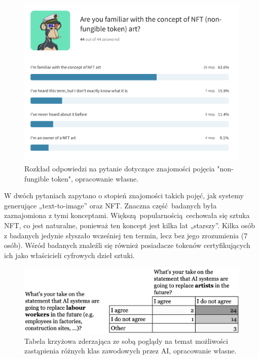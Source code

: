 \documentclass[12pt]{article}
\begin{document}
\begin{figure}[H]
    \centering
    \includegraphics[scale=0.21]{p8}
    \caption{Rozkład odpowiedzi na pytanie dotyczące znajomości pojęcia "non-fungible token", opracowanie własne.}
    \label{fig:25}
\end{figure}


W dwóch pytaniach zapytano o stopień znajomości takich pojęć, jak systemy generujące „text-to-image” oraz NFT. Znaczna część badanych była zaznajomiona z tymi konceptami. Większą popularnością cechowała się sztuka NFT, co jest naturalne, ponieważ ten koncept jest kilka lat „starszy”. Kilka osób z badanych jedynie słyszało wcześniej ten termin, lecz bez jego zrozumienia (7 osób). Wśród badanych znaleźli się również posiadacze tokenów certyfikujących ich jako właścicieli cyfrowych dzieł sztuki.


\begin{figure}[H]
    \centering
    \includegraphics[width=\textwidth]{p9}
    \caption{Tabela krzyżowa zderzająca ze sobą poglądy na temat możliwości zastąpienia różnych klas zawodowych przez AI, opracowanie własne.}
    \label{fig:26}
\end{figure}
\end{document}

